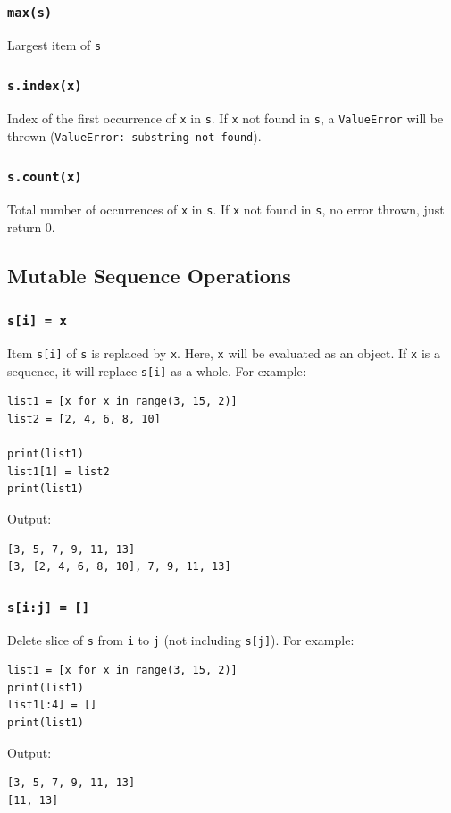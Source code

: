 \documentclass[12pt]{book}
\begin{document}
\subsubsection{\texttt{max(s)}}
\label{sec:orgce3e144}
Largest item of \texttt{s}
\subsubsection{\texttt{s.index(x)}}
\label{sec:orgd3a7097}
Index of the first occurrence of \texttt{x} in \texttt{s}. If \texttt{x} not found in \texttt{s}, a \texttt{ValueError} will be thrown (\texttt{ValueError: substring not found}).
\subsubsection{\texttt{s.count(x)}}
\label{sec:org3a3d30e}
Total number of occurrences of \texttt{x} in \texttt{s}. If \texttt{x} not found in \texttt{s}, no error thrown, just return 0.
\subsection{Mutable Sequence Operations}
\label{sec:orgbf9d6ee}
\subsubsection{\texttt{s[i] = x}}
\label{sec:orgfd2f129}
Item \texttt{s[i]} of \texttt{s} is replaced by \texttt{x}. Here, \texttt{x} will be evaluated as an object. If \texttt{x} is a sequence, it will replace \texttt{s[i]} as a whole. For example:
\begin{verbatim}
list1 = [x for x in range(3, 15, 2)]
list2 = [2, 4, 6, 8, 10]

print(list1)
list1[1] = list2
print(list1)
\end{verbatim}
Output:
\begin{verbatim}
[3, 5, 7, 9, 11, 13]
[3, [2, 4, 6, 8, 10], 7, 9, 11, 13]
\end{verbatim}
\subsubsection{\texttt{s[i:j] = []}}
\label{sec:orgff0daca}
Delete slice of \texttt{s} from \texttt{i} to \texttt{j} (not including \texttt{s[j]}). For example:
\begin{verbatim}
list1 = [x for x in range(3, 15, 2)]
print(list1)
list1[:4] = []
print(list1)
\end{verbatim}
Output:
\begin{verbatim}
[3, 5, 7, 9, 11, 13]
[11, 13]
\end{verbatim}
\end{document}

